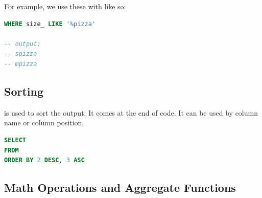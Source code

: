 For example, we use these with  like so:

\begin{lstlisting}[language=SQL]
WHERE size_ LIKE '%pizza'

-- output:
-- spizza
-- mpizza
\end{lstlisting}

\subsection{Sorting}
 is used to sort the output. It comes at the end of
code. It can be used by column name or column position.

\begin{lstlisting}[language=SQL]
SELECT
FROM
ORDER BY 2 DESC, 3 ASC
\end{lstlisting}


\subsection{Math Operations and Aggregate Functions}